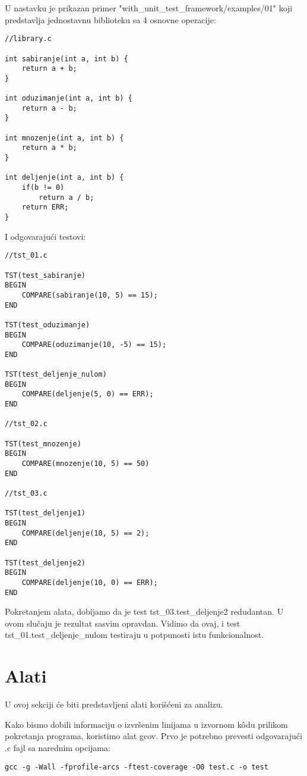 \documentclass[a4paper]{article}
\begin{document}
U nastavku je prikazan primer "with\_unit\_test\_framework/examples/01" koji predstavlja jednostavnu biblioteku sa 4 osnovne operacije:

\begin{lstlisting}
//library.c

int sabiranje(int a, int b) {
	return a + b;
}

int oduzimanje(int a, int b) {
	return a - b;
}

int mnozenje(int a, int b) {
	return a * b;
}

int deljenje(int a, int b) {
	if(b != 0)
		return a / b;
	return ERR;
}
\end{lstlisting}

I odgovarajući testovi:

\begin{lstlisting}
//tst_01.c

TST(test_sabiranje)
BEGIN
	COMPARE(sabiranje(10, 5) == 15);
END

TST(test_oduzimanje)
BEGIN
	COMPARE(oduzimanje(10, -5) == 15);
END

TST(test_deljenje_nulom)
BEGIN
	COMPARE(deljenje(5, 0) == ERR);
END

//tst_02.c

TST(test_mnozenje)
BEGIN
	COMPARE(mnozenje(10, 5) == 50)
END

//tst_03.c

TST(test_deljenje1)
BEGIN
	COMPARE(deljenje(10, 5) == 2);
END

TST(test_deljenje2)
BEGIN
	COMPARE(deljenje(10, 0) == ERR);
END
\end{lstlisting}

Pokretanjem alata, dobijamo da je test tst\_03.test\_deljenje2 redudantan. U ovom slučaju je rezultat sasvim opravdan. Vidimo da ovaj, i test tst\_01.test\_deljenje\_nulom testiraju u potpunosti istu funkcionalnost.

\section{Alati}
\label{sec:tools}

U ovoj sekciji će biti predstavljeni alati korišćeni za analizu.

Kako bismo dobili informaciju o izvršenim linijama u izvornom kôdu prilikom pokretanja programa, koristimo alat gcov. Prvo je potrebno prevesti odgovarajući .c fajl sa narednim opcijama:

\begin{verbatim}
gcc -g -Wall -fprofile-arcs -ftest-coverage -O0 test.c -o test
\end{verbatim}
\end{document}
